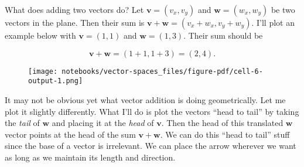 \documentclass[
  letterpaper,
  DIV=11,
  numbers=noendperiod]{scrreprt}
\newenvironment{Shaded}{\begin{snugshade}}{\end{snugshade}}
\newcommand{\DecValTok}[1]{\textcolor[rgb]{0.68,0.00,0.00}{#1}}
\newcommand{\NormalTok}[1]{\textcolor[rgb]{0.00,0.23,0.31}{#1}}
\newcommand{\OperatorTok}[1]{\textcolor[rgb]{0.37,0.37,0.37}{#1}}
\newcommand{\SpecialCharTok}[1]{\textcolor[rgb]{0.37,0.37,0.37}{#1}}
\newcommand{\SpecialStringTok}[1]{\textcolor[rgb]{0.13,0.47,0.30}{#1}}
\newcommand{\StringTok}[1]{\textcolor[rgb]{0.13,0.47,0.30}{#1}}
\begin{document}
What does adding two vectors do? Let \(\mathbf{v}=(v_x,v_y)\) and
\(\mathbf{w}=(w_x,w_y)\) be two vectors in the plane. Then their sum is
\(\mathbf{v}+\mathbf{w} = (v_x+w_x,v_y+w_y)\). I'll plot an example
below with \(\mathbf{v}=(1,1)\) and \(\mathbf{w}=(1,3)\). Their sum
should be

\[\mathbf{v}+\mathbf{w}=(1+1,1+3)=(2,4).\]

\begin{Shaded}
\end{Shaded}

\begin{figure}[H]

{\centering \texttt{[image: notebooks/vector-spaces\_files/figure-pdf/cell-6-output-1.png]}

}

\end{figure}

It may not be obvious yet what vector addition is doing geometrically.
Let me plot it slightly differently. What I'll do is plot the vectors
``head to tail'' by taking the \emph{tail} of \(\mathbf{w}\) and placing
it at the \emph{head} of \(\mathbf{v}\). Then the head of this
translated \(\mathbf{w}\) vector points at the head of the sum
\(\mathbf{v}+\mathbf{w}\). We can do this ``head to tail'' stuff since
the base of a vector is irrelevant. We can place the arrow wherever we
want as long as we maintain its length and direction.
\end{document}
